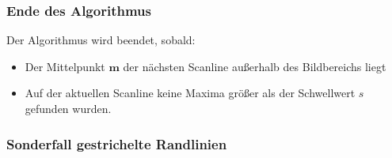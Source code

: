 \subsubsection{Ende des Algorithmus}
Der Algorithmus wird beendet, sobald:
\begin{itemize}
\item Der Mittelpunkt \begin{math} \boldsymbol{m}  \end{math} der nächsten Scanline außerhalb des Bildbereichs liegt
\item Auf der aktuellen Scanline keine Maxima größer als der Schwellwert \begin{math} s \end{math} gefunden wurden.
\end{itemize}

\subsubsection{Sonderfall gestrichelte Randlinien}
